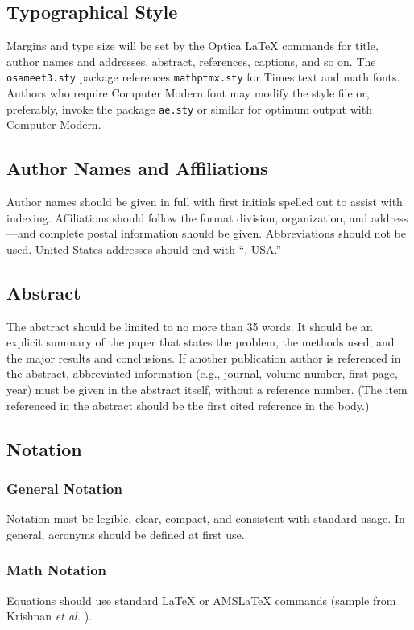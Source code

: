 \documentclass[letterpaper,10pt]{article}
\begin{document}
\subsection{Typographical Style}
Margins and type size will be set by the Optica \LaTeX{}
commands for title, author names and addresses, abstract,
references, captions, and so on. The \texttt{osameet3.sty} package
references \texttt{mathptmx.sty} for Times text and math fonts.
Authors who require Computer Modern font may modify the style file
or, preferably, invoke the package \texttt{ae.sty} or similar for
optimum output with Computer Modern.

\subsection{Author Names and Affiliations}
Author names should be given in full with first initials spelled out to assist with indexing.
Affiliations should follow the format division, organization, and address---and complete postal information should be given.
Abbreviations should not be used. United States addresses should end
with ``, USA.''

\subsection{Abstract} The abstract
should be limited to no more than 35 words. It should be an
explicit summary of the paper that states the problem, the methods
used, and the major results and conclusions. If another publication author is referenced in the abstract, abbreviated information
(e.g., journal, volume number, first page, year) must be
given in the abstract itself, without a reference number. (The item referenced in the abstract should be the first
cited reference  in the body.)

\subsection{Notation}
\subsubsection{General Notation}
Notation must be
legible, clear, compact, and consistent with standard usage. In
general, acronyms should be defined at first use.


\subsubsection{Math Notation}
Equations should use standard \LaTeX{} or AMS\LaTeX{} commands (sample from Krishnan \textit{et al.} \cite{krishnan00}).
\end{document}
